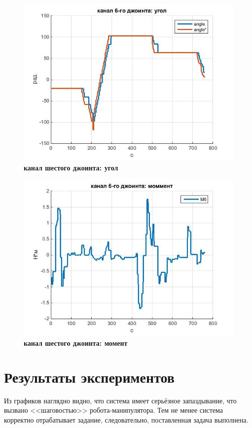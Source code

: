 \documentclass[a4paper,14pt,russian]{extreport} \usepackage{extsizes}
\begin{document}
			\begin{figure}[h!]
				\centering		 
				\includegraphics[width=5.5in]{./graph/j6.jpg}	
				\caption{
					\textbf{канал шестого джоинта: угол}
				}
				\label{fig_img53}
			\end{figure}
		
			
			\begin{figure}[h!]
				\centering		 
				\includegraphics[width=5.5in]{./graph/m6.jpg}	
				\caption{
					\textbf{канал шестого джоинта: момент}
				}
				\label{fig_img56}
			\end{figure}
			\section{Результаты экспериментов}
			Из графиков наглядно видно, что система имеет серьёзное запаздывание, что вызвано <<шаговостью>> робота-манипулятора. 
			Тем не менее система корректно отрабатывает задание, следовательно, поставленная задача выполнена.	
	\newpage
	
\end{document}
